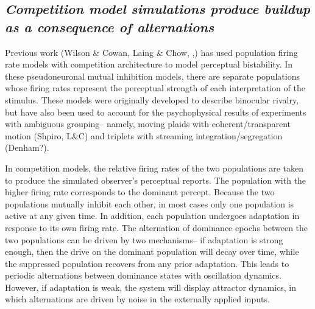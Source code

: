 \documentclass[10pt]{article}
\begin{document}
\subsection*{\emph{Competition model simulations produce buildup as a consequence of alternations}} 

Previous work (Wilson \& Cowan, Laing \& Chow, \cite{Shpiro2009},\cite{Pastukhov2013}) has used population firing rate models with competition architecture to model perceptual bistability. In these pseudoneuronal mutual inhibition models, there are separate populations whose firing rates represent the perceptual strength of each interpretation of the stimulus. These models were originally developed to describe binocular rivalry, but have also been used to account for the psychophysical results of experiments with ambiguous grouping-- namely, moving plaids with coherent/transparent motion (Shpiro, L\&C) and triplets with streaming integration/segregation (Denham?).

In competition models, the relative firing rates of the two populations are taken to produce the simulated observer's perceptual reports. The population with the higher firing rate corresponds to the dominant percept. Because the two populations mutually inhibit each other, in most cases only one population is active at any given time. In addition, each population undergoes adaptation in response to its own firing rate. The alternation of dominance epochs between the two populations can be driven by two mechanisms-- if adaptation is strong enough, then the drive on the dominant population will decay over time, while the suppressed population recovers from any prior adaptation. This leads to periodic alternations between dominance states with oscillation dynamics. However, if adaptation is weak, the system will display attractor dynamics, in which alternations are driven by noise in the externally applied inputs.
\end{document}
